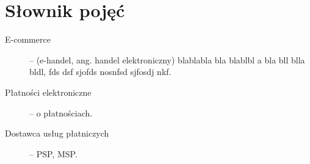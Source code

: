 \section*{Słownik pojęć}

\begin{description}
	\item[E-commerce] -- (e-handel, ang. handel elektroniczny) blablabla bla blablbl a bla bll blla bldl, fds dsf  sjofds nosnfsd sjfosdj nkf.
	\item[Płatności elektroniczne] -- o płatnościach.
	\item[Dostawca usług płatniczych] -- PSP, MSP.
\end{description}